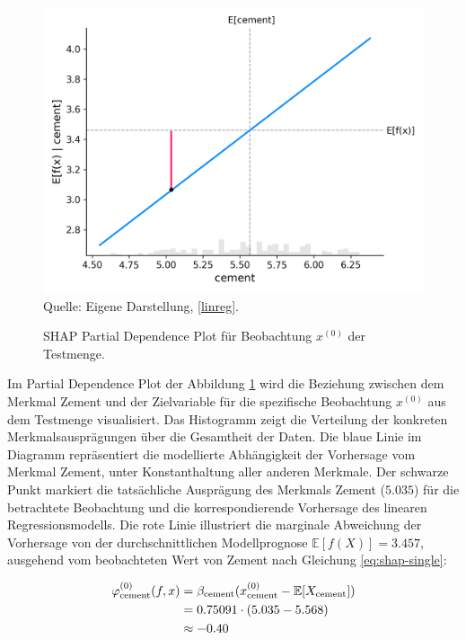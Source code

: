 \begin{figure}[!h]
    \caption{SHAP Partial Dependence Plot für Beobachtung $x^{(0)}$ der Testmenge.}
    \includegraphics[width=1\textwidth]{../scripts/images/shap_dependence_plot.png}
    Quelle: Eigene Darstellung, \ref{linreg}.
    \label{pic:shap_dependence}
\end{figure}

Im Partial Dependence Plot der Abbildung \ref{pic:shap_dependence} wird die Beziehung zwischen 
dem Merkmal Zement und der Zielvariable für die spezifische Beobachtung $x^{(0)}$ aus dem Testmenge visualisiert. 
Das Histogramm zeigt die Verteilung der konkreten Merkmalsausprägungen über die Gesamtheit der Daten.
Die blaue Linie im Diagramm repräsentiert die modellierte Abhängigkeit der Vorhersage vom Merkmal Zement, 
unter Konstanthaltung aller anderen Merkmale. Der schwarze Punkt markiert die tatsächliche Ausprägung des 
Merkmals Zement ($5.035$) für die betrachtete Beobachtung und die korrespondierende Vorhersage 
des linearen Regressionsmodells. Die rote Linie illustriert die marginale Abweichung der Vorhersage 
von der durchschnittlichen Modellprognose $\mathbb{E}[f(X)] = 3.457$, ausgehend vom 
beobachteten Wert von Zement nach Gleichung \ref{eq:shap-single}:

\begin{align}
    \label{eq:shap0}
    \varphi_{\text{cement}}^{(0)}(f, x) &= \beta_{\text{cement}} (x_{\text{cement}}^{(0)} - \mathbb{E}[X_{\text{cement}}]) \\ \notag
                        &= 0.75091 \cdot (5.035 - 5.568) \\ \notag
                        &\approx -0.40
\end{align}

